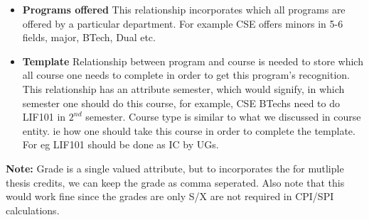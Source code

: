 \documentclass[a4paper]{article}
\begin{document}
\begin{itemize}
	\item{\textbf{Programs offered}} This relationship incorporates which all programs are offered by a
	particular department. For example CSE offers minors in 5-6 fields, major, BTech, Dual etc.
	\item{\textbf{Template}} Relationship between program and course is needed to store which all course one
	needs to complete in order to get this program's recognition. This relationship has an attribute semester,
	which would signify, in which semester one should do this course, for example, CSE BTechs need to do LIF101
	in $2^{nd}$ semester. Course type is similar to what we discussed in course entity. ie how one should take this
	course in order to complete the template. For eg LIF101 should be done as IC by UGs.
\end{itemize}

\textbf{Note:} Grade is a single valued attribute, but to incorporates the for mutliple thesis credits, we can keep the grade as comma seperated. Also note that this would work fine since the grades are only S/X are not required in CPI/SPI calculations.

\pagebreak
\end{document}
